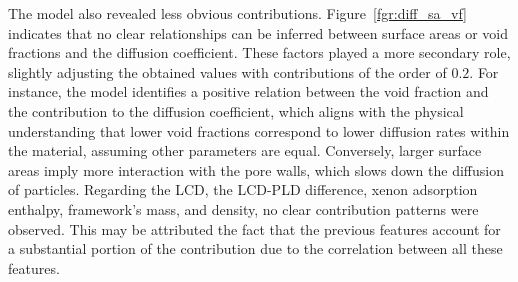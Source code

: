 \documentclass[main]{subfiles}
\begin{document}
The model also revealed less obvious contributions. Figure~\ref{fgr:diff_sa_vf} indicates that no clear relationships can be inferred between surface areas or void fractions and the diffusion coefficient. These factors played a more secondary role, slightly adjusting the obtained values with contributions of the order of $0.2$. For instance, the model identifies a positive relation between the void fraction and the contribution to the diffusion coefficient, which aligns with the physical understanding that lower void fractions correspond to lower diffusion rates within the material, assuming other parameters are equal. Conversely, larger surface areas imply more interaction with the pore walls, which slows down the diffusion of particles. Regarding the LCD, the LCD-PLD difference, xenon adsorption enthalpy, framework's mass, and density, no clear contribution patterns were observed. This may be attributed the fact that the previous features account for a substantial portion of the contribution due to the correlation between all these features.
\end{document}
